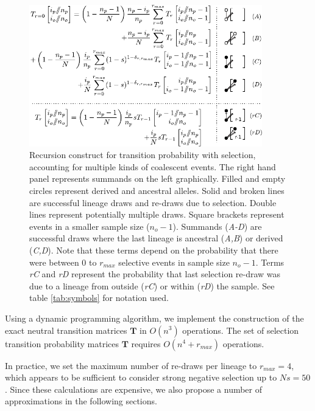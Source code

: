 \documentclass[review]{elsarticle}
\begin{document}
\begin{figure}
  \centering
  \includegraphics[width=0.9\textwidth]{fig/recurrence-selection-dynamic-failures-annotated.pdf}

  \caption{Recursion construct for transition probability with selection, accounting for multiple
    kinds of coalescent events. The right hand panel represents summands on the left graphically.
    Filled and empty circles represent derived and ancestral alleles. Solid and broken lines are
    successful lineage draws and re-draws due to selection. Double lines represent potentially
    multiple draws. Square brackets represent events in a smaller sample size ($n_o-1$). Summands
    (\textit{A-D}) are successful draws where the last lineage is ancestral (\textit{A,B}) or
    derived (\textit{C,D}). Note that these terms depend on the probability that there were between
    $0$ to $r_{max}$ selective events in sample size $n_o-1$. Terms \textit{rC} and \textit{rD}
    represent the probability that last selection re-draw was due to a lineage from outside
    (\textit{rC}) or within (\textit{rD}) the sample. See table \ref{tab:symbols} for notation used.
  }

  \label{fig:rec-selection-dynamic-fail}
\end{figure}
 

Using a dynamic programming algorithm, we implement the construction of the exact neutral transition
matrices $\mathbf{T}$ in $O(n^3)$ operations. The set of selection transition probability matrices
$\mathbf{T}$ requires $O(n^4+r_{max})$ operations.

In practice, we set the maximum number of re-draws per lineage to $r_{max}=4$, which appears to be
sufficient to consider strong negative selection up to $Ns=50$. Since these calculations are
expensive, we also propose a number of approximations in the following sections.
\end{document}
